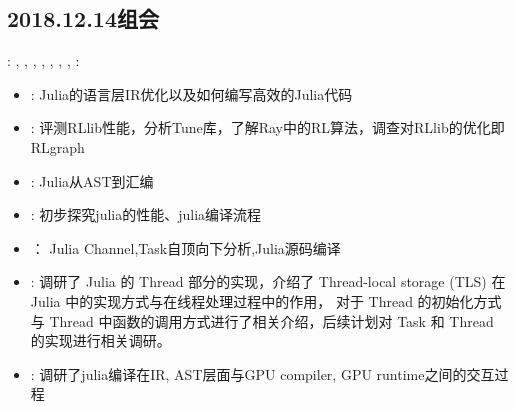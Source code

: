 \subsection{2018.12.14组会}
\label{sec:g2018:1019}
: \ZY, \ZhangLF, \CaiWT, \DongH, \HeLY, \YuCD, \DaiL, \HeJY
\newline
{}:\DaiL
\newline

\begin{itemize}
\item \YuCD:
Julia的语言层IR优化以及如何编写高效的Julia代码 

\item \DongH:
评测RLlib性能，分析Tune库，了解Ray中的RL算法，调查对RLlib的优化即RLgraph

\item \CaiWT:
Julia从AST到汇编

\item \HeLY:
初步探究julia的性能、julia编译流程

\item \HeJY：
Julia Channel,Task自顶向下分析,Julia源码编译

\item \ZhangLF:
调研了 Julia 的 Thread 部分的实现，介绍了 Thread-local storage (TLS) 在 Julia 中的实现方式与在线程处理过程中的作用，
对于 Thread 的初始化方式与 Thread 中函数的调用方式进行了相关介绍，后续计划对 Task 和 Thread 的实现进行相关调研。

\item \DaiL:
调研了julia编译在IR, AST层面与GPU compiler, GPU runtime之间的交互过程


\end{itemize}

